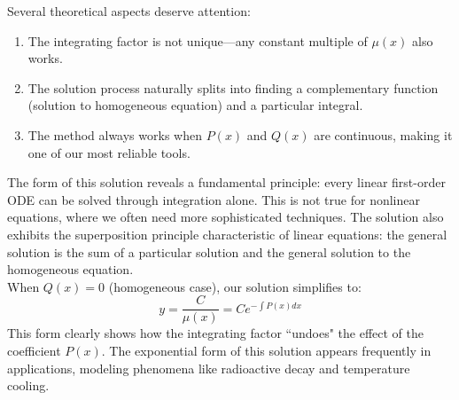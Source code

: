 \noindent Several theoretical aspects deserve attention:

\begin{enumerate}
    \item The integrating factor is not unique—any constant multiple of $\mu(x)$ also works.
    \item The solution process naturally splits into finding a complementary function (solution to homogeneous equation) and a particular integral.
    \item The method always works when $P(x)$ and $Q(x)$ are continuous, making it one of our most reliable tools.
\end{enumerate}

\noindent The form of this solution reveals a fundamental principle: every linear first-order ODE can be solved through integration alone. This is not true for nonlinear equations, where we often need more sophisticated techniques. The solution also exhibits the superposition principle characteristic of linear equations: the general solution is the sum of a particular solution and the general solution to the homogeneous equation. \\

\noindent When $Q(x) = 0$ (homogeneous case), our solution simplifies to:
\[
y = \frac{C}{\mu(x)} = Ce^{-\int P(x)dx}
\]
This form clearly shows how the integrating factor ``undoes" the effect of the coefficient $P(x)$. The exponential form of this solution appears frequently in applications, modeling phenomena like radioactive decay and temperature cooling.

